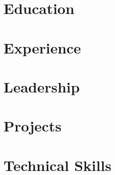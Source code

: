 %
%





\section{Education}
\EducationContent

\section{Experience}
  \resumeSubHeadingListStart
    \ExperienceEntries
  \resumeSubHeadingListEnd

\ifShowLeadership
\section{Leadership}
  \resumeSubHeadingListStart
    \LeadershipEntries
  \resumeSubHeadingListEnd
\fi

\section{Projects}
    \resumeSubHeadingListStart
      \ProjectEntries
    \resumeSubHeadingListEnd

\section{Technical Skills}
\SkillsContent


